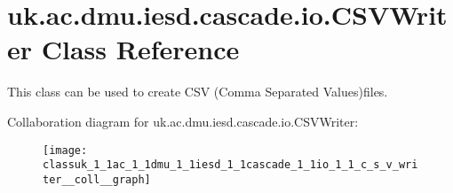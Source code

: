 \hypertarget{classuk_1_1ac_1_1dmu_1_1iesd_1_1cascade_1_1io_1_1_c_s_v_writer}{\section{uk.\-ac.\-dmu.\-iesd.\-cascade.\-io.\-C\-S\-V\-Writer Class Reference}
\label{classuk_1_1ac_1_1dmu_1_1iesd_1_1cascade_1_1io_1_1_c_s_v_writer}
}


This class can be used to create C\-S\-V (Comma Separated Values)files.  




Collaboration diagram for uk.\-ac.\-dmu.\-iesd.\-cascade.\-io.\-C\-S\-V\-Writer\-:\nopagebreak
\begin{figure}[H]
\begin{center}
\leavevmode
\texttt{[image: classuk\_1\_1ac\_1\_1dmu\_1\_1iesd\_1\_1cascade\_1\_1io\_1\_1\_c\_s\_v\_writer\_\_coll\_\_graph]}
\end{center}
\end{figure}
